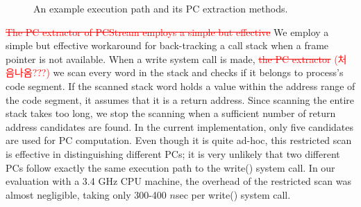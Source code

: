 \begin{figure}[t]
	\centering
	\hfill
	\caption{An example execution path and its PC extraction methods.}
	\label{fig:getpc}
\end{figure}

\textcolor{red}{\sout{The PC extractor of \textsf{\small PCStream} employs a simple but effective}}
We employ a simple but effective workaround for back-tracking a call stack when
a frame pointer is not available.  When a write system call is made,
\textcolor{red}{\sout{the PC extractor} (처음나옴???)} we scan every word in the stack
and checks if it belongs to process's code segment.  If the scanned stack word
holds a value within the address range of the code segment, it assumes that it
is a return address.  Since scanning the entire stack takes too long, we stop
the scanning when a sufficient number of return address candidates are found.
In the current implementation, only five candidates are used for PC
computation.  Even though it is quite ad-hoc, this restricted scan is effective
in distinguishing different PCs; it is very unlikely that two different PCs
follow exactly the same execution path to the \textsf{\small write()} system
call.  In our evaluation with a 3.4 GHz CPU machine, the overhead of the
restricted scan was almost negligible, taking only 300-400 $n$sec per
\textsf{\small write()} system call.




